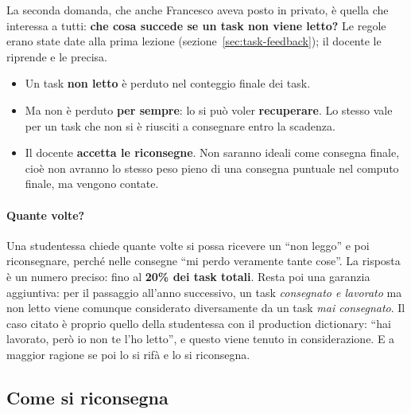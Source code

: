 La seconda domanda, che anche Francesco aveva posto in privato, è quella che
interessa a tutti: \textbf{che cosa succede se un task non viene letto?} Le
regole erano state date alla prima lezione
(sezione~\ref{sec:task-feedback}); il docente le riprende e le precisa.
\begin{itemize}
  \item Un task \textbf{non letto} è perduto nel conteggio finale dei task.
  \item Ma non è perduto \textbf{per sempre}: lo si può voler
        \textbf{recuperare}. Lo stesso vale per un task che non si è
        riusciti a consegnare entro la scadenza.
  \item Il docente \textbf{accetta le riconsegne}. Non saranno ideali come
        consegna finale, cioè non avranno lo stesso peso pieno di una
        consegna puntuale nel computo finale, ma vengono contate.
\end{itemize}

\paragraph{Quante volte?} Una studentessa chiede quante volte si possa
ricevere un ``non leggo'' e poi riconsegnare, perché nelle consegne ``mi
perdo veramente tante cose''. La risposta è un numero preciso: fino al
\textbf{20\% dei task totali}. Resta poi una garanzia aggiuntiva: per il
passaggio all'anno successivo, un task \emph{consegnato e lavorato} ma non
letto viene comunque considerato diversamente da un task \emph{mai
consegnato}. Il caso citato è proprio quello della studentessa con il
production dictionary: ``hai lavorato, però io non te l'ho letto'', e questo
viene tenuto in considerazione. E a maggior ragione se poi lo si rifà e lo si
riconsegna.

\subsection{Come si riconsegna}

